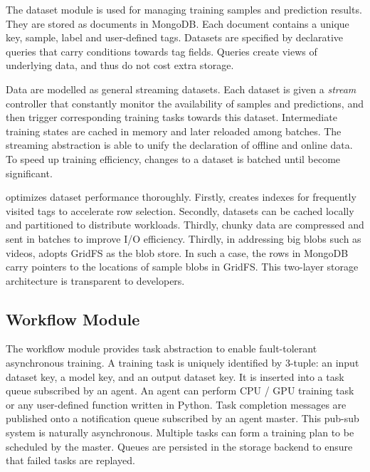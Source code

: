 The dataset module is used for managing training samples and prediction results. 
They are stored as documents in MongoDB. Each document contains a unique key, sample, label and user-defined tags.
Datasets are specified by declarative queries that carry conditions towards tag fields. 
Queries create views of underlying data, and thus do not cost extra storage.

Data are modelled as general streaming datasets. Each dataset is given a \emph{stream}
controller that constantly monitor the availability
of samples and predictions, and then trigger corresponding
training tasks towards this dataset. Intermediate training states are cached in memory
and later reloaded among batches.
The streaming abstraction is able to unify the declaration of offline and online data.
To speed up training efficiency, changes to a dataset is batched until
become significant.

\tl optimizes dataset performance thoroughly. Firstly, 
\tl creates indexes for frequently visited tags to accelerate
row selection. Secondly, datasets can be cached locally and partitioned to distribute workloads.
Thirdly, chunky data are compressed and sent in 
batches to improve I/O efficiency. Thirdly, in addressing
big blobs such as videos, \tl
adopts GridFS as the blob store.
In such a case, the rows in MongoDB carry pointers to the locations of sample blobs in GridFS. 
This two-layer storage architecture is transparent to developers. 

\subsection{Workflow Module}

The workflow module provides task abstraction to enable fault-tolerant asynchronous training. 
A training task is uniquely identified by 3-tuple: an input dataset key, a model key, and an output dataset key.
It is inserted into a task queue subscribed by an agent. An agent can
perform CPU / GPU training task or any user-defined function written in Python. Task completion messages are published onto a notification
queue subscribed by an agent master. 
This pub-sub system is naturally asynchronous. Multiple tasks can form a training plan to be scheduled by the master. Queues are persisted in the storage backend to ensure that failed tasks are replayed.

